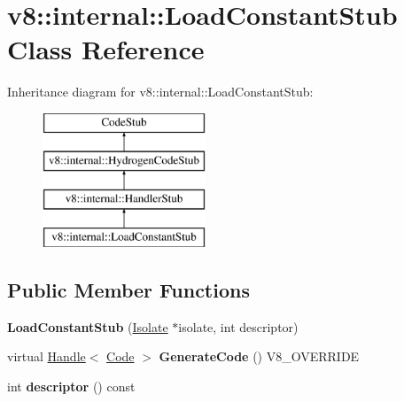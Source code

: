 \hypertarget{classv8_1_1internal_1_1_load_constant_stub}{}\section{v8\+:\+:internal\+:\+:Load\+Constant\+Stub Class Reference}
\label{classv8_1_1internal_1_1_load_constant_stub}
Inheritance diagram for v8\+:\+:internal\+:\+:Load\+Constant\+Stub\+:\begin{figure}[H]
\begin{center}
\leavevmode
\includegraphics[height=4.000000cm]{classv8_1_1internal_1_1_load_constant_stub}
\end{center}
\end{figure}
\subsection*{Public Member Functions}
\begin{DoxyCompactItemize}
\item 
\hypertarget{classv8_1_1internal_1_1_load_constant_stub_a3218dae5c33f2f473d0603c4858f8ff1}{}{\bfseries Load\+Constant\+Stub} (\hyperlink{classv8_1_1internal_1_1_isolate}{Isolate} $\ast$isolate, int descriptor)\label{classv8_1_1internal_1_1_load_constant_stub_a3218dae5c33f2f473d0603c4858f8ff1}

\item 
\hypertarget{classv8_1_1internal_1_1_load_constant_stub_a64c1b635702b045b8cf430e77339c608}{}virtual \hyperlink{classv8_1_1internal_1_1_handle}{Handle}$<$ \hyperlink{classv8_1_1internal_1_1_code}{Code} $>$ {\bfseries Generate\+Code} () V8\+\_\+\+O\+V\+E\+R\+R\+I\+D\+E\label{classv8_1_1internal_1_1_load_constant_stub_a64c1b635702b045b8cf430e77339c608}

\item 
\hypertarget{classv8_1_1internal_1_1_load_constant_stub_af3d9dc94429db6ebabee61218b3c4550}{}int {\bfseries descriptor} () const \label{classv8_1_1internal_1_1_load_constant_stub_af3d9dc94429db6ebabee61218b3c4550}

\end{DoxyCompactItemize}
